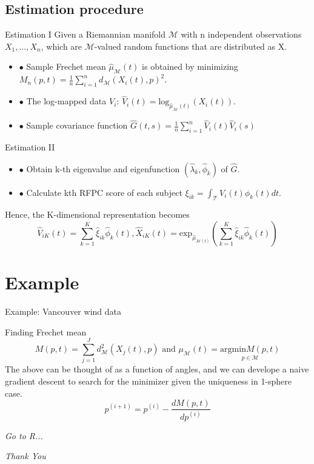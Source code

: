 \documentclass{beamer}
\begin{document}
\subsection{Estimation procedure}

\begin{frame}{Estimation I}
Given a Riemannian manifold $\mathcal{M}$ with n independent observations $X_{1},...,X_{n}$, which are $\mathcal{M}$-valued random functions that are distributed as X.
\begin{itemize}
  \item $\bullet$ Sample Frechet mean $\hat{\mu}_{\mathcal{M}}(t)$ is obtained by minimizing $M_{n}(p,t) = \frac{1}{n}\sum_{i=1}^{n}d_{\mathcal{M}}(X_{i}(t),p)^{2}$.
  \item $\bullet$ The log-mapped data $V_{i}$: $\hat{V}_{i}(t) =\text{log}_{\hat{\mu}_{\mathcal{M}}(t)}(X_{i}(t))$.
  \item $\bullet$ Sample covariance function $\hat{G}(t,s) = \frac{1}{n}\sum_{i=1}^{n}\hat{V}_{i}(t)\hat{V}_{i}(s)$
\end{itemize}
\end{frame}

\begin{frame}{Estimation II}
\begin{itemize}
  \item $\bullet$ Obtain k-th eigenvalue and eigenfunction $(\hat{\lambda}_{k},\hat{\phi}_{k})$ of $\hat{G}$.
  \item $\bullet$ Calculate kth RFPC score of each subject $\xi_{ik} = \int_{\mathcal{T}}V_{i}(t)\phi_{k}(t)dt$.
  \end{itemize}
  Hence, the K-dimensional representation becomes
  \begin{equation*}
    \hat{V}_{iK}(t) = \sum_{k=1}^{K}\hat{\xi}_{ik}\hat{\phi}_{k}(t) , \hat{X}_{iK}(t) = \text{exp}_{\hat{\mu}_{\mathcal{M}(t)}}(\sum_{k=1}^{K}\hat{\xi}_{ik}\hat{\phi}_{k}(t))
  \end{equation*}
\end{frame}


\section{Example}
\begin{frame}{Example: Vancouver wind data}
\end{frame}

\begin{frame}{Finding Frechet mean}
\begin{equation*}
M(p,t) = \sum_{j=1}^{J}d^{2}_{\mathcal{M}}(X_{j}(t),p) \text{ and } \mu_{\mathcal{M}}(t) = \underset{p\in\mathcal{M}}{\text{argmin}M(p,t)}
\end{equation*}
The above can be thought of as a function of angles, and we can develope a naive gradient descent to search for the minimizer given the uniqueness in 1-sphere case. 
\begin{equation*}
  p^{(i+1)} = p^{(i)} - \frac{dM(p,t)}{dp^{(i)}}
\end{equation*}
\end{frame}

\begin{frame}{}
 \centering \Huge
  \emph{Go to R...}
\end{frame}


\begin{frame}{}
  \centering \Huge
  \emph{Thank You}
\end{frame}
\end{document}
